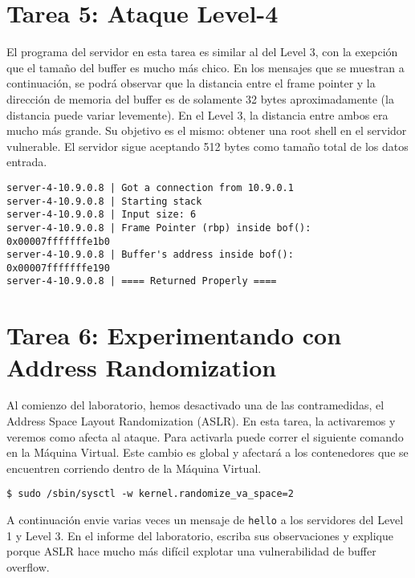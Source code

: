 \section{Tarea 5: Ataque Level-4} 

El programa del servidor en esta tarea es similar al del Level 3, con la exepción que el tamaño del buffer es mucho más chico. En los mensajes que se muestran a continuación, se podrá observar que la distancia entre el frame pointer y la dirección de memoria del buffer es de solamente 32 bytes aproximadamente (la distancia puede variar levemente).
En el Level 3, la distancia entre ambos era mucho más grande. Su objetivo es el mismo: obtener una root shell en el servidor vulnerable. El servidor sigue aceptando 512 bytes como tamaño total de los datos entrada.

\begin{lstlisting}
server-4-10.9.0.8 | Got a connection from 10.9.0.1
server-4-10.9.0.8 | Starting stack
server-4-10.9.0.8 | Input size: 6
server-4-10.9.0.8 | Frame Pointer (rbp) inside bof():  0x00007fffffffe1b0
server-4-10.9.0.8 | Buffer's address inside bof():     0x00007fffffffe190
server-4-10.9.0.8 | ==== Returned Properly ====
\end{lstlisting}
 

\section{Tarea 6: Experimentando con Address Randomization}

Al comienzo del laboratorio, hemos desactivado una de las contramedidas, el Address Space Layout Randomization (ASLR). En esta tarea, la activaremos y veremos como afecta al ataque. Para activarla puede correr el siguiente comando en la Máquina Virtual. Este cambio es global y afectará a los contenedores que se encuentren corriendo dentro de la Máquina Virtual.


\begin{lstlisting}
$ sudo /sbin/sysctl -w kernel.randomize_va_space=2
\end{lstlisting}

A continuación envie varias veces un mensaje de \texttt{hello} a los servidores del Level 1 y Level 3.
En el informe del laboratorio, escriba sus observaciones y explique porque ASLR hace mucho más difícil explotar una vulnerabilidad de buffer overflow.


